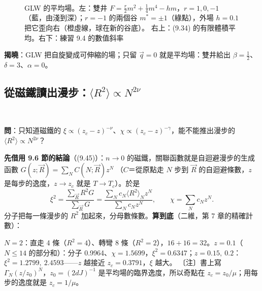 \begin{figure}[htbp]
\centering
\begin{minipage}[c]{0.5\linewidth}\centering\NineFigWell\end{minipage}\hfill
\begin{minipage}[c]{0.48\linewidth}\centering\footnotesize\setlength{\tabcolsep}{3pt}\NineTabZmf\\[8pt]\NineTabExNineFour\end{minipage}
\caption{GLW 的平均場。左：雙井 $F=\frac r2m^2+\frac14m^4-hm$，$r=1,0,-1$（藍，由淺到深）；$r=-1$ 的兩個谷 $m^*=\pm1$（綠點），外場 $h=0.1$ 把它歪向右（橙虛線，球在新的谷底）。
右上：(9.34) 的有限體積平均。右下：練習 9.4 的數值斜率}\label{nine-fig-glw}
\end{figure}

\textbf{揭曉}：GLW 把自旋變成可伸縮的場；只留 $\vec q=0$ 就是平均場：雙井給出 $\beta=\frac12$、$\delta=3$、$\alpha=0$。

\subsection{從磁鐵讀出漫步：\texorpdfstring{$\langle R^2\rangle\propto N^{2\nu}$}{⟨R²⟩ 正比於 N 的 2ν 次方}}
\leavevmode{}\ \par\nopagebreak

\textbf{問}：只知道磁鐵的 $\xi\propto(z_c-z)^{-\nu}$、$\chi\propto(z_c-z)^{-\gamma}$，能不能推出漫步的 $\langle R^2\rangle\propto N^{2\nu}$？

\textbf{先借用 9.6 節的結論}（(9.45)）：$n\to0$ 的磁鐵，關聯函數就是自迴避漫步的生成函數 $G(z;\vec R)=\sum_NC(N;\vec R)z^N$
（$C$＝從原點走 $N$ 步到 $\vec R$ 的自迴避條數，$z$ 是每步的逸度，$z\to z_c$ 就是 $T\to T_c$）。於是
\[\xi^2=\frac{\sum_{\vec R}R^2G}{\sum_{\vec R}G}=\frac{\sum_Nc_N\langle R^2\rangle_Nz^N}{\sum_Nc_Nz^N},\qquad\chi=\sum_Nc_Nz^N .\tag{9.36, 9.37}\]
分子把每一條漫步的 $R^2$ 加起來，分母數條數。\textbf{算到底}（二維，第 7 章的精確計數）：
\begin{center}
\footnotesize\setlength{\tabcolsep}{3.5pt}\NineTabSaw\hfill\NineTabCoef
\end{center}
$N=2$：直走 4 條（$R^2=4$）、轉彎 8 條（$R^2=2$），$16+16=32$。$z=0.1$（$N\le14$ 的部分和）：分子 0.9964、$\chi=1.5699$，$\xi^2=0.6347$；$z=0.15,\ 0.2$：$\xi^2=1.2799,\ 2.4593$——$z$ 越接近 $z_c=0.3791$，$\xi$ 越大。
〔注〕書上寫 $\Gamma_N(z/z_0)^N$，$z_0=(2dJ)^{-1}$ 是平均場的臨界逸度，所以奇點在 $z_c=z_0/\mu$；用每步的逸度就是 $z_c=1/\mu$。

